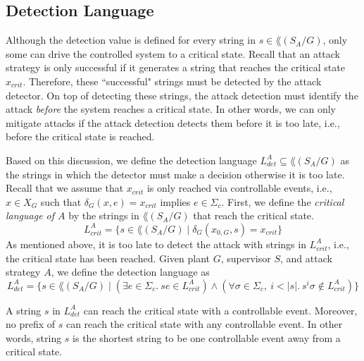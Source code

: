 
\subsection{Detection Language}
Although the detection value is defined for every string in $s\in \lang(S_A/G)$, only some can drive the controlled system to a critical state. 
Recall that an attack strategy is only successful if it generates a string that reaches the critical state $x_{crit}$.
Therefore, these ``successful" strings must be detected by the attack detector.
On top of detecting these strings, the attack detection must identify the attack \emph{before} the system reaches a critical state. 
In other words, we can only mitigate attacks if the attack detection detects them before it is too late, i.e., before the critical state is reached.

Based on this discussion, we define the detection language $L^A_{det}\subseteq \lang(S_A/G)$ as the strings in which the detector must make a decision otherwise it is too late. 
Recall that we assume that $x_{crit}$ is only reached via controllable events, i.e., $x \in X_G$ such that $\delta_G(x,e) = x_{crit}$ implies $e\in \Sigma_c$.
First, we define the \emph{critical language of $A$} by the strings in $\lang(S_A/G)$ that reach the critical state.
\begin{equation}
L_{crit}^A = \{s\in \lang(S_A/G)\mid \delta_G(x_{0,G},s) = x_{crit}\}
\end{equation}
As mentioned above, it is too late to detect the attack with strings in $L_{crit}^A$, i.e., the critical state has been reached.
Given plant $G$, supervisor $S$, and attack strategy $A$, we define the detection language as 
\begin{equation}\label{eq:det_lang}
L_{det}^A = \{s\in \lang(S_A/G)\mid (\exists e\in \Sigma_c.\ se\in L_{crit}^A)\wedge (\forall \sigma\in \Sigma_c,\ i<|s|.\ s^i\sigma \notin L_{crit}^A)\}
\end{equation}

A string $s$ in $L^A_{det}$ can reach the critical state with a controllable event.
Moreover, no prefix of $s$ can reach the critical state with any controllable event.
In other words, string $s$ is the shortest string to be one controllable event away from a critical state. 

